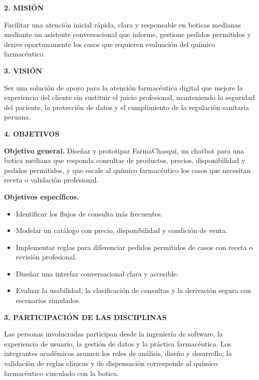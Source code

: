 \documentclass[11pt,a4paper]{article}
\newcommand{\apartado}[1]{\vspace{0.8em}\noindent\textbf{#1}\par\vspace{0.25em}}
\begin{document}
\apartado{2. MISIÓN}

Facilitar una atención inicial rápida, clara y responsable en boticas medianas mediante un asistente conversacional que informe, gestione pedidos permitidos y derive oportunamente los casos que requieren evaluación del químico farmacéutico.

\apartado{3. VISIÓN}

Ser una solución de apoyo para la atención farmacéutica digital que mejore la experiencia del cliente sin sustituir el juicio profesional, manteniendo la seguridad del paciente, la protección de datos y el cumplimiento de la regulación sanitaria peruana.

\apartado{4. OBJETIVOS}

\textbf{Objetivo general.} Diseñar y prototipar FarmaChasqui, un chatbot para una botica mediana que responda consultas de productos, precios, disponibilidad y pedidos permitidos, y que escale al químico farmacéutico los casos que necesitan receta o validación profesional.

\textbf{Objetivos específicos.}
\begin{itemize}[leftmargin=1.4em,itemsep=0.25em]
    \item Identificar los flujos de consulta más frecuentes.
    \item Modelar un catálogo con precio, disponibilidad y condición de venta.
    \item Implementar reglas para diferenciar pedidos permitidos de casos con receta o revisión profesional.
    \item Diseñar una interfaz conversacional clara y accesible.
    \item Evaluar la usabilidad, la clasificación de consultas y la derivación segura con escenarios simulados.
\end{itemize}

\apartado{3. PARTICIPACIÓN DE LAS DISCIPLINAS}

Las personas involucradas participan desde la ingeniería de software, la experiencia de usuario, la gestión de datos y la práctica farmacéutica. Los integrantes académicos asumen los roles de análisis, diseño y desarrollo; la validación de reglas clínicas y de dispensación corresponde al químico farmacéutico vinculado con la botica.
\end{document}
